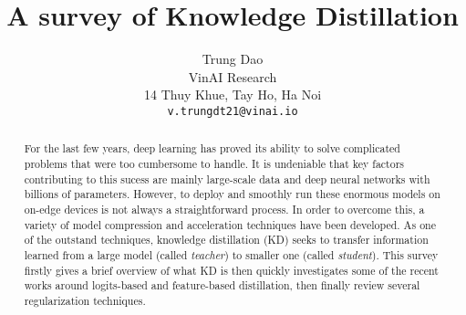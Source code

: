 \documentclass[10pt,twocolumn,letterpaper]{article}
\begin{document}
\title{A survey of Knowledge Distillation}

\author{Trung Dao\\
VinAI Research\\
14 Thuy Khue, Tay Ho, Ha Noi\\
{\tt\small v.trungdt21@vinai.io}
}

\maketitle

\begin{abstract}
   For the last few years, deep learning has proved its ability to solve complicated problems that were too cumbersome to handle. It is undeniable that key factors contributing to this sucess are mainly large-scale data and deep neural networks with billions of parameters. However, to deploy and smoothly run these enormous models on on-edge devices is not always a straightforward process. In order to overcome this, a variety of model compression and acceleration techniques have been developed. As one of the outstand techniques, knowledge distillation (KD) seeks to transfer information learned from a large model (called \textit{teacher}) to smaller one (called \textit{student}). This survey firstly gives a brief overview of what KD is then quickly investigates some of the recent works around logits-based and feature-based distillation, then finally review several regularization techniques.
\end{abstract}







{\small


}
\end{document}
